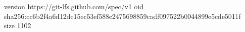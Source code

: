 version https://git-lfs.github.com/spec/v1
oid sha256:cc6b2f4a6d12dc15ec53ef588c2475698859cadf097522b0044899e5cde5011f
size 1102
